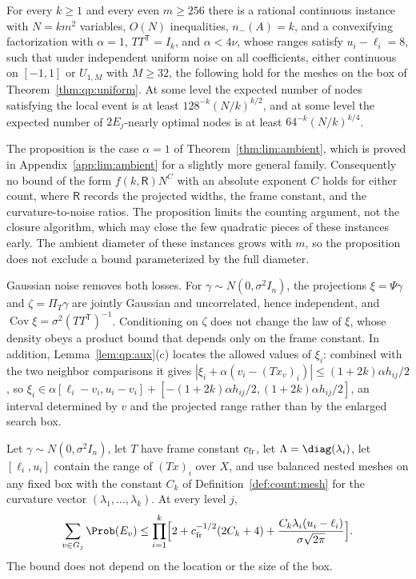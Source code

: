 \begin{proposition}\label{prop:qp:ambient-barrier}
For every $k\ge1$ and every even $m\ge256$ there is a rational continuous
instance with $N=km^2$ variables, $O(N)$ inequalities, $n_-(A)=k$, and a
convexifying factorization with $\alpha=1$, $TT^{\mathsf T}=I_k$, and $\alpha<4\nu$,
whose ranges satisfy $u_i-\ell_i=8$, such that under independent uniform
noise on all coefficients, either continuous on $[-1,1]$ or $U_{1,M}$
with $M\ge32$, the following hold for the meshes on the box of
Theorem~\ref{thm:qp:uniform}. At some level the expected number of nodes
satisfying the local event is at least $128^{-k}(N/k)^{k/2}$, and at some
level the expected number of $2E_j$-nearly optimal nodes is at least
$64^{-k}(N/k)^{k/4}$.
\end{proposition}

The proposition is the case $\alpha=1$ of Theorem~\ref{thm:lim:ambient}, which
is proved in Appendix~\ref{app:lim:ambient} for a slightly more general
family. Consequently no bound of the form $f(k,\mathsf R)N^{C}$ with an
absolute exponent $C$ holds for either count, where $\mathsf R$ records the projected
widths, the frame constant, and the curvature-to-noise ratios. The proposition
limits the counting argument, not the closure algorithm, which may close the
few quadratic pieces of these instances early. The ambient diameter of these
instances grows with $m$, so the proposition does not exclude a bound
parameterized by the full diameter.

Gaussian noise removes both losses. For $\gamma\sim N(0,\sigma^2I_n)$, the
projections $\xi=\Psi\gamma$ and $\zeta=\Pi_T\gamma$ are jointly Gaussian and
uncorrelated, hence independent, and
$\operatorname{Cov}\xi=\sigma^2(TT^{\mathsf T})^{-1}$. Conditioning on $\zeta$ does not
change the law of $\xi$, whose density obeys a product bound that depends only
on the frame constant. In addition, Lemma~\ref{lem:qp:aux}(c) locates the
allowed values of $\xi_i$: combined with the two neighbor comparisons it
gives $|\xi_i+\alpha(v_i-(Tx_v)_i)|\le(1+2k)\alpha h_{ij}/2$, so
$\xi_i\in\alpha[\ell_i-v_i,u_i-v_i]+[-(1+2k)\alpha h_{ij}/2,(1+2k)\alpha h_{ij}/2]$,
an interval determined by $v$ and the projected range rather than by the
enlarged search box.

\begin{lemma}\label{lem:qp:gauss-count}
Let $\gamma\sim N(0,\sigma^2I_n)$, let $T$ have frame constant $c_{\rm fr}$,
let $\Lambda=\diag(\lambda_i)$, let $[\ell_i,u_i]$ contain the range of
$(Tx)_i$ over $X$, and use balanced nested meshes on any fixed box with the
constant $C_k$ of Definition~\ref{def:count:mesh} for the curvature vector
$(\lambda_1,\dots,\lambda_k)$. At every level $j$,
\[
 \sum_{v\in G_j}\Prob(E_v)\le\prod_{i=1}^k\Bigl[2+c_{\rm fr}^{-1/2}(2C_k+4)
 +\frac{C_k\lambda_i(u_i-\ell_i)}{\sigma\sqrt{2\pi}}\Bigr].
\]
The bound does not depend on the location or the size of the box.
\end{lemma}

